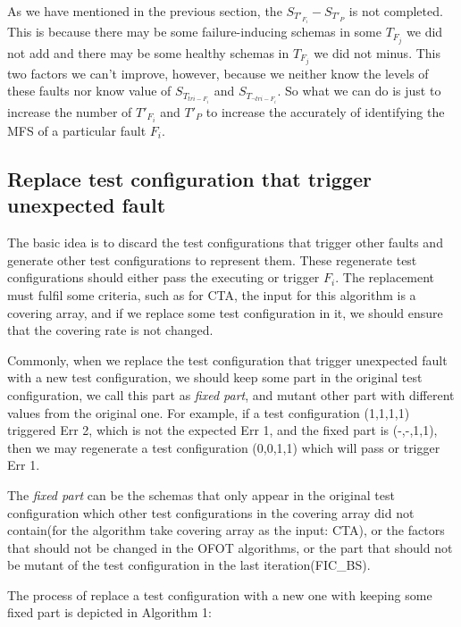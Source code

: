 \documentclass{sig-alternate}
\begin{document}
As we have mentioned in the previous section, the $S_{T'_{F_{i}}} - S_{T'_{P}}$ is not completed. This is because there may be some failure-inducing schemas in some $T_{F_{j}}$ we did not add and there may be some healthy schemas in $T_{F_{j}}$ we did not minus. This two factors we can't improve, however, because we neither know the levels of these faults nor know value of $S_{T_{tri-F_{i}}}$ and  $S_{T_{\neg tri-F_{i}}}$. So what we can do is just to increase the number of $T'_{F_{i}}$ and $T'_{P}$ to increase the accurately of identifying the MFS of a particular fault $F_{i}$.

\subsection{Replace test configuration that trigger unexpected fault}

The basic idea is to discard the test configurations that trigger other faults and generate other test configurations to represent them. These regenerate test configurations should either pass the executing or trigger $F_{i}$.  The replacement must fulfil some criteria, such as for CTA, the input for this algorithm is a covering array, and if we replace some test configuration in it, we should ensure that the covering rate is not changed.

Commonly, when we replace the test configuration that trigger unexpected fault with a new test configuration, we should keep some part in the original test configuration, we call this part as \emph{fixed part}, and mutant other part with different values from the original one. For example, if a test configuration (1,1,1,1) triggered Err 2, which is not the expected Err 1, and the fixed part is (-,-,1,1), then we may regenerate a test configuration (0,0,1,1) which will pass or trigger Err 1.

The \emph{fixed part} can be the schemas that only appear in the original test configuration which other test configurations in the covering array did not contain(for the algorithm take covering array as the input: CTA), or the factors that should not be changed in the OFOT algorithms, or the part that should not be mutant of the test configuration in the last iteration(FIC\_BS).

The process of replace a test configuration with a new one with keeping some fixed part is depicted in Algorithm 1:
\end{document}
